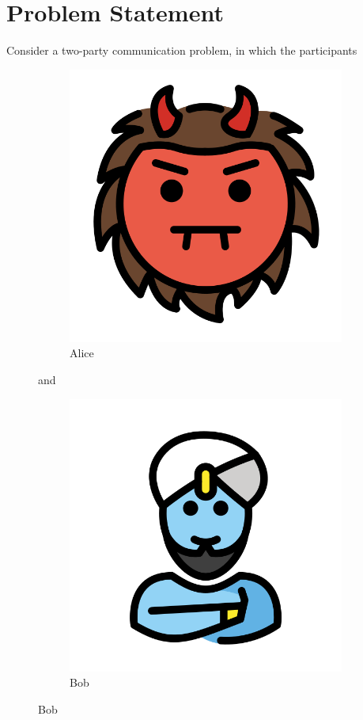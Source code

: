 \documentclass[12pt]{article}
\begin{document}
\maketitle

\section{Problem Statement}

Consider a two-party communication problem,
	in which the participants

\begin{figure}[h]
\centering
\begin{subfigure}{.3\textwidth}
  \centering
  \includegraphics[width=.2\linewidth]{alice.png}
  \caption{Alice}
  \label{fig:alice}
\end{subfigure}%
and
\begin{subfigure}{.3\textwidth}
  \centering
  \includegraphics[width=.2\linewidth]{bob.png}
  \caption{Bob}
  \label{fig:bob}
\end{subfigure}
\label{fig:participants}
\end{figure}
\end{document}
